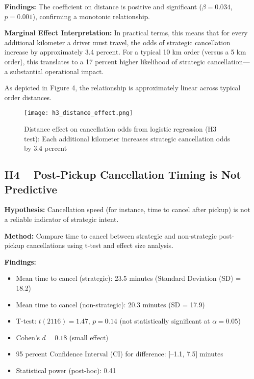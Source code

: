 \documentclass[12pt,letterpaper]{article}
\begin{document}
\textbf{Findings:} The coefficient on distance is positive and significant ($\beta = 0.034$, $p = 0.001$), confirming a monotonic relationship.

\textbf{Marginal Effect Interpretation:} In practical terms, this means that for every additional kilometer a driver must travel, the odds of strategic cancellation increase by approximately 3.4 percent. For a typical 10 km order (versus a 5 km order), this translates to a 17 percent higher likelihood of strategic cancellation—a substantial operational impact.

As depicted in Figure 4, the relationship is approximately linear across typical order distances.

\begin{figure}[H]
\centering
\texttt{[image: h3\_distance\_effect.png]}
\caption{Distance effect on cancellation odds from logistic regression (H3 test): Each additional kilometer increases strategic cancellation odds by 3.4 percent}
\label{fig:h3_distance}
\end{figure}

\subsection{H4 -- Post-Pickup Cancellation Timing is Not Predictive}

\textbf{Hypothesis:} Cancellation speed (for instance, time to cancel after pickup) is not a reliable indicator of strategic intent.

\textbf{Method:} Compare time to cancel between strategic and non-strategic post-pickup cancellations using t-test and effect size analysis.

\textbf{Findings:}  
\begin{itemize}
    \item Mean time to cancel (strategic): 23.5 minutes (Standard Deviation (SD) = 18.2)
    \item Mean time to cancel (non-strategic): 20.3 minutes (SD = 17.9)
    \item T-test: $t(2116) = 1.47$, $p = 0.14$ (not statistically significant at $\alpha = 0.05$)
    \item Cohen's $d = 0.18$ (small effect)
    \item 95 percent Confidence Interval (CI) for difference: [--1.1, 7.5] minutes
    \item Statistical power (post-hoc): 0.41
\end{itemize}
\end{document}
